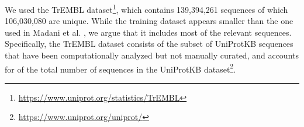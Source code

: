 \begin{table}[h]
\centering
\renewcommand{\arraystretch}{1.4}
\vspace{2mm}
\caption{Statistics for the TrEMBL single sequence and the long sequence task.}
\label{table-trembl-statistics}
\end{table}

We used the TrEMBL dataset\footnote{\url{https://www.uniprot.org/statistics/TrEMBL}}, which contains 139,394,261 sequences of which 106,030,080 are unique. While the training dataset appears smaller than the one used in Madani et al. \citep{progen}, we argue that it includes most of the relevant sequences. Specifically, the TrEMBL dataset consists of the subset of UniProtKB sequences that have been computationally analyzed but not manually curated, and accounts for  of the total number of sequences in the UniProtKB dataset\footnote{\url{https://www.uniprot.org/uniprot/}}.


